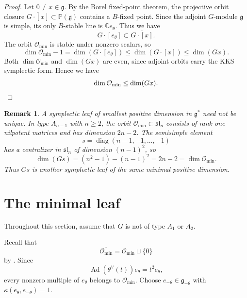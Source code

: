 \documentclass[12pt]{article}
\theoremstyle{paperplain}
\theoremstyle{paperdefinition}
\newtheorem{remark}[theorem]{Remark}
\DeclareMathOperator{\Ad}{Ad}
\newcommand{\C}{\mathbb C}
\newcommand{\Omin}{\mathcal O_{\min}}
\newcommand{\g}{\mathfrak g}
\begin{document}
\begin{proof}
    Let $0\ne x\in\g$. By the Borel fixed-point theorem, the projective orbit closure $\overline{G\cdot[x]}\subset\mathbb P(\g)$ contains a $B$-fixed point. Since the adjoint $G$-module $\g$ is simple, its only $B$-stable line is $\C e_\theta$. Thus we have
    $$
        G\cdot[e_\theta]\subset\overline{G\cdot[x]}.
    $$
    The orbit $\Omin$ is stable under nonzero scalars, so
    $$
        \dim\Omin-1
        =\dim(G\cdot[e_\theta])
        \le\dim(G\cdot[x])
        \le\dim(Gx).
    $$
    Both $\dim\Omin$ and $\dim(Gx)$ are even, since adjoint orbits carry the KKS symplectic form. Hence we have
    \[
        \dim\Omin\le\dim(Gx).\qedhere
    \]
\end{proof}

\begin{remark}\label{rem:type-a-minimal-dimension}
    A symplectic leaf of smallest positive dimension in $\g^*$ need not be unique. In type $A_{n-1}$ with $n\ge2$, the orbit $\Omin\subset\mathfrak{sl}_n$ consists of rank-one nilpotent matrices and has dimension $2n-2$. The semisimple element
    $$
        s=\operatorname{diag}(n-1,-1,\ldots,-1)
    $$
    has a centralizer in $\mathfrak{sl}_n$ of dimension $(n-1)^2$, so
    $$
        \dim(Gs)=(n^2-1)-(n-1)^2=2n-2=\dim\Omin.
    $$
    Thus $Gs$ is another symplectic leaf of the same minimal positive dimension.
\end{remark}

\vspace{2em}
\section{The minimal leaf}\label{sec:minimal-leaf}

Throughout this section, assume that $G$ is not of type $A_1$ or $A_2$.

Recall that
$$
    \overline{\Omin}=\Omin\sqcup\{0\}
$$
by \cite[Section~4.3]{CollingwoodMcGovern}. Since
$$
    \Ad(\theta^\vee(t))e_\theta=t^2e_\theta,
$$
every nonzero multiple of $e_\theta$ belongs to $\Omin$. Choose $e_{-\theta}\in\g_{-\theta}$ with $\kappa(e_\theta,e_{-\theta})=1$.
\end{document}
